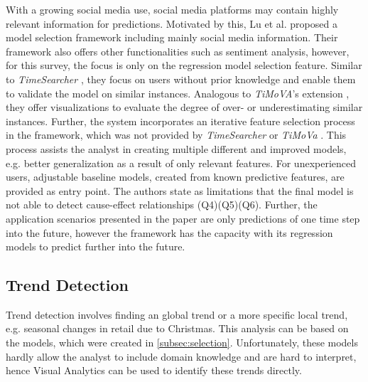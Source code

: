 \documentclass[electronic]{vgtc}             %
\begin{document}
With a growing social media use, social media platforms may contain highly relevant information for predictions. 
Motivated by this, Lu et al. \cite{lu:2014} proposed a model selection framework including mainly social media information. 
Their framework also offers other functionalities such as sentiment analysis, however, for this survey, the focus is only on the regression model selection feature.
Similar to \textit{TimeSearcher} \cite{buono:2007}, they focus on users without prior knowledge and enable them to validate the model on similar instances. 
Analogous to \textit{TiMoVA}'s extension \cite{boegl:2014}, they offer visualizations to evaluate the degree of over- or underestimating similar instances.
Further, the system incorporates an iterative feature selection process in the framework, which was not provided by \textit{TimeSearcher} \cite{buono:2007} or \textit{TiMoVa} \cite{boegl:2013}.
This process assists the analyst in creating multiple different and improved models, e.g. better generalization as a result of only relevant features.
For unexperienced users, adjustable baseline models, created from known predictive features, are provided as entry point.
The authors state as limitations that the final model is not able to detect cause-effect relationships (Q4)(Q5)(Q6). 
Further, the application scenarios presented in the paper are only predictions of one time step into the future, however the framework has the capacity with its regression models to predict further into the future.


\subsection{Trend Detection\label{subsec:trend}}
Trend detection involves finding an global trend or a more specific local trend, e.g. seasonal changes in retail due to Christmas.
This analysis can be based on the models, which were created in \autoref{subsec:selection}.
Unfortunately, these models hardly allow the analyst to include domain knowledge and are hard to interpret, hence Visual Analytics can be used to identify these trends directly.
\end{document}
